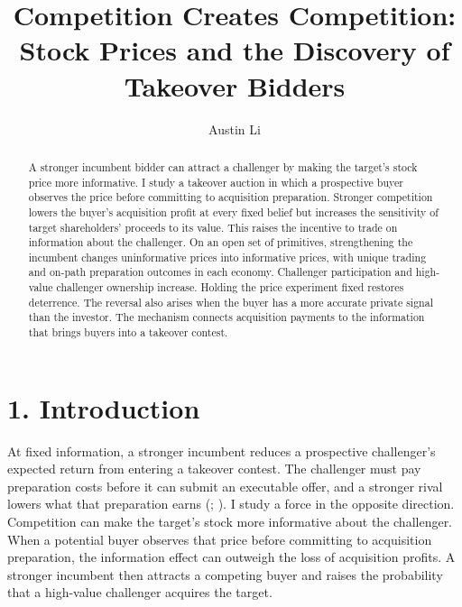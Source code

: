 \documentclass[
  12pt,
]{article}
\title{Competition Creates Competition: Stock Prices and the Discovery
of Takeover Bidders}
\author{Austin Li}
\date{}
\begin{document}
\maketitle
\begin{abstract}
A stronger incumbent bidder can attract a challenger by making the
target's stock price more informative. I study a takeover auction in
which a prospective buyer observes the price before committing to
acquisition preparation. Stronger competition lowers the buyer's
acquisition profit at every fixed belief but increases the sensitivity
of target shareholders' proceeds to its value. This raises the incentive
to trade on information about the challenger. On an open set of
primitives, strengthening the incumbent changes uninformative prices
into informative prices, with unique trading and on-path preparation
outcomes in each economy. Challenger participation and high-value
challenger ownership increase. Holding the price experiment fixed
restores deterrence. The reversal also arises when the buyer has a more
accurate private signal than the investor. The mechanism connects
acquisition payments to the information that brings buyers into a
takeover contest.
\end{abstract}

\section{1. Introduction}\label{sec-introduction}

At fixed information, a stronger incumbent reduces a prospective
challenger's expected return from entering a takeover contest. The
challenger must pay preparation costs before it can submit an executable
offer, and a stronger rival lowers what that preparation earns
(;
). I study a
force in the opposite direction. Competition can make the target's stock
more informative about the challenger. When a potential buyer observes
that price before committing to acquisition preparation, the information
effect can outweigh the loss of acquisition profits. A stronger
incumbent then attracts a competing buyer and raises the probability
that a high-value challenger acquires the target.
\end{document}
